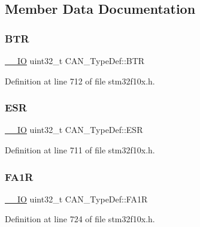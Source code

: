 \subsection{Member Data Documentation}
\mbox{\label{struct_c_a_n___type_def_accad1e4155459a13369f5ad0e7c6da29}} 
\subsubsection{\texorpdfstring{B\+TR}{BTR}}
{\footnotesize\ttfamily \hyperlink{core__sc300_8h_aec43007d9998a0a0e01faede4133d6be}{\+\_\+\+\_\+\+IO} uint32\+\_\+t C\+A\+N\+\_\+\+Type\+Def\+::\+B\+TR}



Definition at line 712 of file stm32f10x.\+h.

\mbox{\label{struct_c_a_n___type_def_ab1a1b6a7c587443a03d654d3b9a94423}} 
\subsubsection{\texorpdfstring{E\+SR}{ESR}}
{\footnotesize\ttfamily \hyperlink{core__sc300_8h_aec43007d9998a0a0e01faede4133d6be}{\+\_\+\+\_\+\+IO} uint32\+\_\+t C\+A\+N\+\_\+\+Type\+Def\+::\+E\+SR}



Definition at line 711 of file stm32f10x.\+h.

\mbox{\label{struct_c_a_n___type_def_ab57a3a6c337a8c6c7cb39d0cefc2459a}} 
\subsubsection{\texorpdfstring{F\+A1R}{FA1R}}
{\footnotesize\ttfamily \hyperlink{core__sc300_8h_aec43007d9998a0a0e01faede4133d6be}{\+\_\+\+\_\+\+IO} uint32\+\_\+t C\+A\+N\+\_\+\+Type\+Def\+::\+F\+A1R}



Definition at line 724 of file stm32f10x.\+h.

